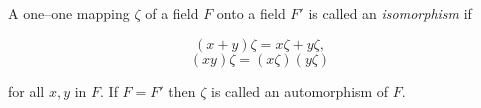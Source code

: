 A one--one mapping $\zeta$ of a field $F$ onto a field $F'$ is called an \textit{isomorphism} if

$$(x+y)\zeta = x\zeta + y\zeta,$$
$$(xy)\zeta = (x\zeta)(y\zeta)$$

for all $x, y$ in $F$. If $F = F'$ then $\zeta$ is called an automorphism of $F$.
